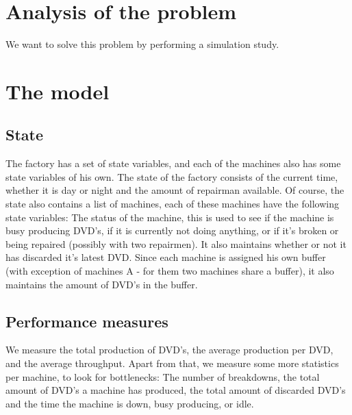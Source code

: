 \documentclass{article}
\begin{document}
\section{Analysis of the problem}
We want to solve this problem by performing a simulation study. %


\section{The model}
\subsection{State}
The factory has a set of state variables, and each of the machines also has some state variables of his own.
The state of the factory consists of the current time, whether it is day or night and the amount of repairman available.
Of course, the state also contains a list of machines, each of these machines have the following state variables:
The status of the machine, this is used to see if the machine is busy producing DVD's, if it is currently not doing anything, or if it's broken or being repaired (possibly with two repairmen).
It also maintains whether or not it has discarded it's latest DVD\@.
Since each machine is assigned his own buffer (with exception of machines A - for them two machines share a buffer), it also maintains the amount of DVD's in the buffer.

\subsection{Performance measures}
\label{performance_measures}
We measure the total production of DVD's, the average production per DVD,
and the average throughput.
Apart from that, we measure some more statistics per machine, to look for bottlenecks:
The number of breakdowns, the total amount of DVD's a machine has produced,
the total amount of discarded DVD's and the time the machine is down, busy producing, or idle.
\end{document}
